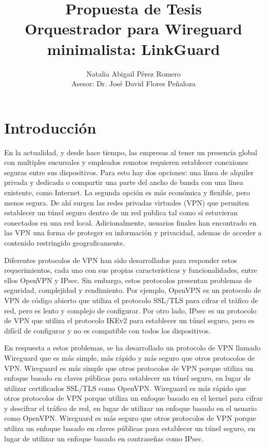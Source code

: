 \documentclass[letterpaper,12pt,oneside]{book}
\title{Propuesta de Tesis \\ Orquestrador para Wireguard minimalista: LinkGuard}
\author{Natalia Abigail Pérez Romero \\ Asesor: Dr. José David Flores Peñaloza}
\begin{document}
\maketitle


\section{Introducción}

En la actualidad, y desde hace tiempo, las empresas al tener un presencia global con multiples sucursales y empleados remotos requieren establecer conexiones seguras entre sus dispositivos. Para esto hay dos opciones: una línea de alquiler privada y dedicada o compartir una parte del ancho de banda con una línea existente, como Internet. La segunda opción es más económica y flexible, pero menos segura. De ahí surgen las redes privadas virtuales (VPN) que permiten establecer un túnel seguro dentro de un red publica tal como si estuvieran conectados en una red local. Adicionalmente, usuarios finales han encontrado en las VPN una forma de proteger su información y privacidad, ademas de acceder a contenido restringido geograficamente.

Diferentes protocolos de VPN han sido desarrollados para responder estos requerimientos, cada uno con sus propias características y funcionalidades, entre ellos OpenVPN y IPsec. Sin embargo, estos protocolos presentan problemas de seguridad, complejidad y rendimiento. Por ejemplo, OpenVPN es un protocolo de VPN de código abierto que utiliza el protocolo SSL/TLS para cifrar el tráfico de red, pero es lento y complejo de configurar. Por otro lado, IPsec es un protocolo de VPN que utiliza el protocolo IKEv2 para establecer un túnel seguro, pero es difícil de configurar y no es compatible con todos los dispositivos.

En respuesta a estos problemas, se ha desarrollado un protocolo de VPN llamado Wireguard que es más simple, más rápido y más seguro que otros protocolos de VPN. Wireguard es más simple que otros protocolos de VPN porque utiliza un enfoque basado en claves públicas para establecer un túnel seguro, en lugar de utilizar certificados SSL/TLS como OpenVPN. Wireguard es más rápido que otros protocolos de VPN porque utiliza un enfoque basado en el kernel para cifrar y descifrar el tráfico de red, en lugar de utilizar un enfoque basado en el usuario como OpenVPN. Wireguard es más seguro que otros protocolos de VPN porque utiliza un enfoque basado en claves públicas para establecer un túnel seguro, en lugar de utilizar un enfoque basado en contraseñas como IPsec.
\end{document}

